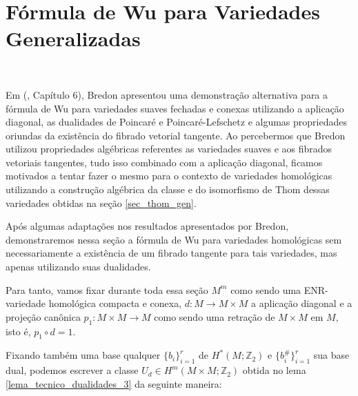 \documentclass[12pt,oneside]{book} %
\newcommand{\Z}{\mathbb{Z}}
\begin{document}



\section{Fórmula de Wu para Variedades Generalizadas}\label{sec_form_wu_gen}

\

\par Em (\cite{bredon}, Capítulo 6), Bredon apresentou uma demonstração alternativa para a fórmula de Wu para variedades suaves fechadas e conexas utilizando a aplicação diagonal, as dualidades de Poincaré e Poincaré-Lefschetz e algumas propriedades oriundas da existência do fibrado vetorial tangente. Ao percebermos que Bredon utilizou propriedades algébricas referentes as variedades suaves e aos fibrados vetoriais tangentes, tudo isso combinado com a aplicação diagonal, ficamos motivados a tentar fazer o mesmo para o contexto de variedades homológicas utilizando a construção algébrica da classe e do isomorfismo de Thom dessas variedades obtidas na seção \ref{sec_thom_gen}.

\par Após algumas adaptações nos resultados apresentados por Bredon, demonstraremos nessa seção a fórmula de Wu para variedades homológicas sem necessariamente a existência de um fibrado tangente para tais variedades, mas apenas utilizando suas dualidades.

\par Para tanto, vamos fixar durante toda essa seção $M^{m}$ como sendo uma ENR-variedade homológica compacta e conexa, $d:M\to M\times M$ a aplicação diagonal e a projeção canônica $p_{1}:M\times M\to M$ como sendo uma retração de $M\times M$ em $M$, isto é, $p_{1}\circ d=1$.

\par Fixando também uma base qualquer $\{b_{i}\}_{i=1}^{r}$ de $H^{*}(M;\Z_{2})$ e $\{b^{\#}_{i}\}_{i=1}^{r}$ sua base dual, podemos escrever a classe $U_{d}\in H^{m}(M\times M;\Z_{2})$ obtida no lema \ref{lema_tecnico_dualidades_3} da seguinte maneira:
\end{document}
